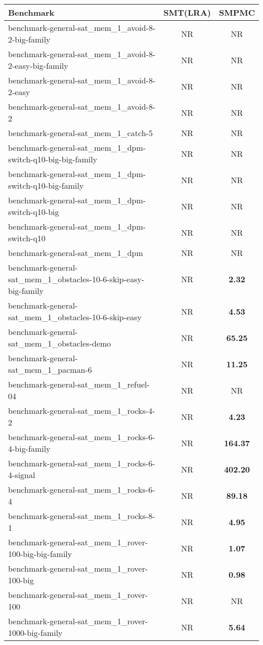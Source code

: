 \begin{tabular}{lcc}
\toprule
Benchmark & SMT(LRA) & SMPMC \\
\midrule
benchmark-general-sat\_mem\_1\_avoid-8-2-big-family & NR & NR \\
benchmark-general-sat\_mem\_1\_avoid-8-2-easy-big-family & NR & NR \\
benchmark-general-sat\_mem\_1\_avoid-8-2-easy & NR & NR \\
benchmark-general-sat\_mem\_1\_avoid-8-2 & NR & NR \\
benchmark-general-sat\_mem\_1\_catch-5 & NR & NR \\
benchmark-general-sat\_mem\_1\_dpm-switch-q10-big-big-family & NR & NR \\
benchmark-general-sat\_mem\_1\_dpm-switch-q10-big-family & NR & NR \\
benchmark-general-sat\_mem\_1\_dpm-switch-q10-big & NR & NR \\
benchmark-general-sat\_mem\_1\_dpm-switch-q10 & NR & NR \\
benchmark-general-sat\_mem\_1\_dpm & NR & NR \\
benchmark-general-sat\_mem\_1\_obstacles-10-6-skip-easy-big-family & NR & \textbf{2.32} \\
benchmark-general-sat\_mem\_1\_obstacles-10-6-skip-easy & NR & \textbf{4.53} \\
benchmark-general-sat\_mem\_1\_obstacles-demo & NR & \textbf{65.25} \\
benchmark-general-sat\_mem\_1\_pacman-6 & NR & \textbf{11.25} \\
benchmark-general-sat\_mem\_1\_refuel-04 & NR & NR \\
benchmark-general-sat\_mem\_1\_rocks-4-2 & NR & \textbf{4.23} \\
benchmark-general-sat\_mem\_1\_rocks-6-4-big-family & NR & \textbf{164.37} \\
benchmark-general-sat\_mem\_1\_rocks-6-4-signal & NR & \textbf{402.20} \\
benchmark-general-sat\_mem\_1\_rocks-6-4 & NR & \textbf{89.18} \\
benchmark-general-sat\_mem\_1\_rocks-8-1 & NR & \textbf{4.95} \\
benchmark-general-sat\_mem\_1\_rover-100-big-big-family & NR & \textbf{1.07} \\
benchmark-general-sat\_mem\_1\_rover-100-big & NR & \textbf{0.98} \\
benchmark-general-sat\_mem\_1\_rover-100 & NR & NR \\
benchmark-general-sat\_mem\_1\_rover-1000-big-family & NR & \textbf{5.64} \\

\end{tabular}
